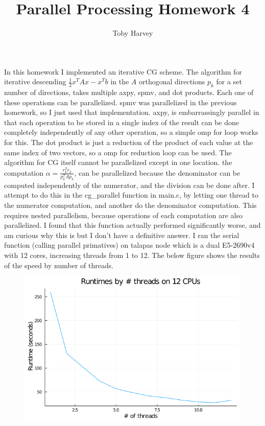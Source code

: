 \documentclass{article}
\begin{document}
\title{Parallel Processing Homework 4}
\author{Toby Harvey}
\maketitle

\noindent In this homework I implemented an iterative CG scheme. The algorithm for iterative descending $\frac{1}{2}x^TAx - x^Tb$ in the $A$ orthogonal directions $p_k$ for a set number of directions, takes multiple axpy, spmv, and dot products. Each one of these operations can be parallelized. spmv was parallelized in the previous homework, so I just used that implementation. axpy, is embarrassingly parallel in that each operation to be stored in a single index of the result can be done completely independently of any other operation, so a simple omp for loop works for this. The dot product is just a reduction of the product of each value at the same index of two vectors, so a omp for reduction loop can be used. The algorithm for CG itself cannot be parallelized except in one location. the computation $\alpha = \frac{r_k^Tr_k}{p^T_kAp_k}$, can be parallelized because the denominator can be computed independently of the numerator, and the division can be done after. I attempt to do this in the cg\_parallel function in main.c, by letting one thread to the numerator computation, and another do the denominator computation. This requires nested parallelism, because operations of each computation are also parallelized. I found that this function actually performed significantly worse, and am curious why this is but I don't have a definitive answer. I ran the serial function (calling parallel primatives) on talapas node which is a dual E5-2690v4 with 12 cores, increasing threads from 1 to 12. The below figure shows the results of the speed by number of threads.
\begin{figure}[h]
  \caption{}
  \includegraphics[scale=.35]{hw4_threads.png}
\end{figure}
\end{document}
